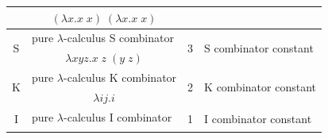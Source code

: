\documentclass[table, a4paper, 10pt]{book}
\begin{document}
\begin{table}[H]
\begin{tabular}{cclcl}
\multicolumn{1}{|c|}{}                        & \multicolumn{2}{c|}{$(\lambda x.x\;x)\;(\lambda x.x\;x)$}                                                                                   & \multicolumn{2}{c|}{}                                                                                                                                                                                       \\ \hline
\multicolumn{1}{|c|}{\multirow{2}{*}{S}}      & \multicolumn{2}{l|}{pure $\lambda$-calculus S combinator}                                                                                   & \multicolumn{1}{c|}{\multirow{2}{*}{3}} & \multicolumn{1}{l|}{\multirow{2}{*}{S combinator constant}}                                                                                                       \\ \cline{2-3}
\multicolumn{1}{|c|}{}                        & \multicolumn{2}{c|}{$\lambda xyz.x\;z\;(y\;z)$}                                                                                             & \multicolumn{1}{c|}{}                   & \multicolumn{1}{l|}{}                                                                                                                                             \\ \hline
\multicolumn{1}{|c|}{\multirow{2}{*}{K}}      & \multicolumn{2}{l|}{pure $\lambda$-calculus K combinator}                                                                                   & \multicolumn{1}{c|}{\multirow{2}{*}{2}} & \multicolumn{1}{l|}{\multirow{2}{*}{K combinator constant}}                                                                                                       \\ \cline{2-3}
\multicolumn{1}{|c|}{}                        & \multicolumn{2}{c|}{$\lambda ij.i$}                                                                                                         & \multicolumn{1}{c|}{}                   & \multicolumn{1}{l|}{}                                                                                                                                             \\ \hline
\multicolumn{1}{|c|}{\multirow{2}{*}{I}}      & \multicolumn{2}{l|}{pure $\lambda$-calculus I combinator}                                                                                   & \multicolumn{1}{c|}{\multirow{2}{*}{1}} & \multicolumn{1}{l|}{\multirow{2}{*}{I combinator constant}}                                                                                                       \\ \cline{2-3}

\end{tabular}
\end{table}
\end{document}
